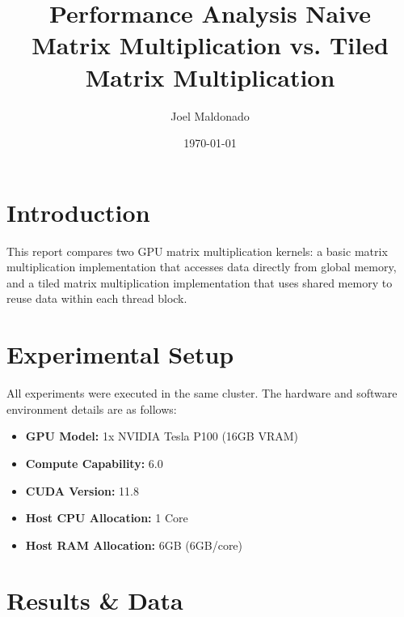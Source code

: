 \documentclass[11pt]{article}
\title{\textbf{Performance Analysis Naive Matrix Multiplication vs. Tiled Matrix Multiplication}}
\author{Joel Maldonado}
\date{\today}
\begin{document}
\maketitle

\section{Introduction}
This report compares two GPU matrix multiplication kernels:
a basic matrix multiplication implementation that accesses data directly from global memory,
and a tiled matrix multiplication implementation that uses shared memory to reuse data
within each thread block.

\section{Experimental Setup}
All experiments were executed in the same cluster. 
The hardware and software environment details are as follows:


\begin{itemize}
\item \textbf{GPU Model:} 1x NVIDIA Tesla P100 (16GB VRAM)
\item \textbf{Compute Capability:} 6.0
\item \textbf{CUDA Version:} 11.8
\item \textbf{Host CPU Allocation:} 1 Core
\item \textbf{Host RAM Allocation:} 6GB (6GB/core)
\end{itemize}

\section{Results \& Data}
\end{document}
